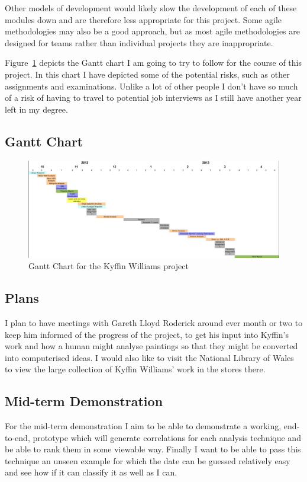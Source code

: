 \documentclass[11pt,fleqn,twoside]{article}
\begin{document}
Other models of development would likely slow the development of each of these modules down and are
therefore less appropriate for this project. Some agile methodologies may also be a good approach,
but as most agile methodologies are designed for teams rather than individual projects they are
inappropriate.

Figure~\ref{fig:gantt} depicts the Gantt chart I am going to try to follow for the course of this
project. In this chart I have depicted some of the potential risks, such as other assignments and
examinations. Unlike a lot of other people I don't have so much of a risk of having to travel to
potential job interviews as I still have another year left in my degree.


\clearpage
\newpage
\subsection{Gantt Chart}
\begin{figure}[H]
\centering
\includegraphics[scale=0.45, angle=90]{img/gantt.png}
\caption{Gantt Chart for the Kyffin Williams project}
\label{fig:gantt}
\end{figure}

\clearpage
\subsection{Plans}
I plan to have meetings with Gareth Lloyd Roderick around ever month or two to keep him informed of
the progress of the project, to get his input into Kyffin's work and how a human might analyse
paintings so that they might be converted into computerised ideas. I would also like to visit the 
National Library of Wales to view the large collection of Kyffin Williams' work in the stores there.


\subsection{Mid-term Demonstration}
For the mid-term demonstration I aim to be able to demonstrate a working, end-to-end, prototype
which will generate correlations for each analysis technique and be able to rank them in some
viewable way. Finally I want to be able to pass this technique an unseen example for which the date
can be guessed relatively easy and see how if it can classify it as well as I can.
\end{document}
